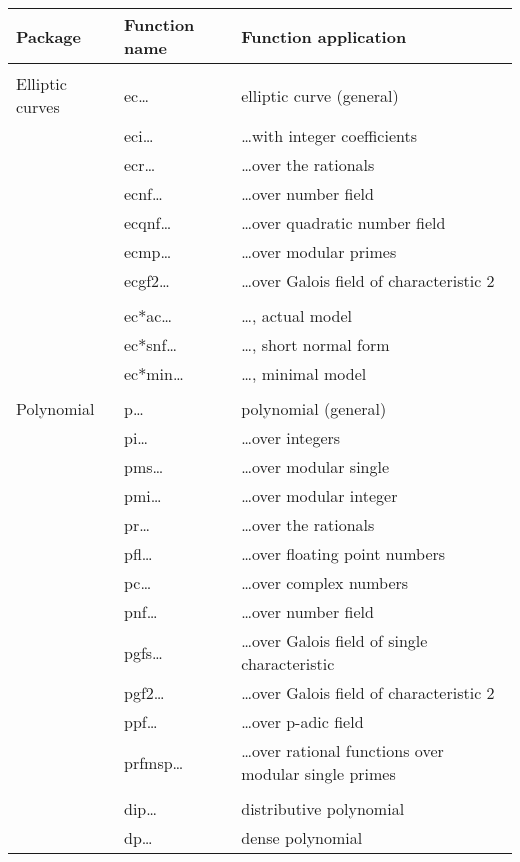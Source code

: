 \begin{tabular}{p{1.0in}p{1.3in}p{3.0in}}
 Package           & Function name & Function application \\ \hline
                   &               & \\
 Elliptic curves   & ec\ldots      & elliptic curve (general)\\
                   & eci\ldots     & \ldots with integer coefficients\\
                   & ecr\ldots     & \ldots over the rationals\\
                   & ecnf\ldots    & \ldots over number field\\
                   & ecqnf\ldots   & \ldots over quadratic number field\\
                   & ecmp\ldots    & \ldots over modular primes\\
                   & ecgf2\ldots   & \ldots over Galois field of characteristic 2\\
                   &               & \\
                   & ec$\ast$ac\ldots   & \ldots , actual model\\
                   & ec$\ast$snf\ldots  & \ldots , short normal form\\
                   & ec$\ast$min\ldots  & \ldots , minimal model\\
                   &               & \\
 Polynomial        & p\ldots       & polynomial (general)\\
                   & pi\ldots      & \ldots over integers\\
                   & pms\ldots     & \ldots over modular single\\
                   & pmi\ldots     & \ldots over modular integer\\ 
                   & pr\ldots      & \ldots over the rationals\\
                   & pfl\ldots     & \ldots over floating point numbers\\
                   & pc\ldots      & \ldots over complex numbers\\
                   & pnf\ldots     & \ldots over number field\\
                   & pgfs\ldots    & \ldots over Galois field of single characteristic\\
                   & pgf2\ldots    & \ldots over Galois field of characteristic 2\\
                   & ppf\ldots     & \ldots over p-adic field\\
                   & prfmsp\ldots  & \ldots over rational functions over modular single primes \\
                   &               & \\
                   & dip\ldots     & distributive polynomial\\
                   & dp\ldots      & dense polynomial\\


\end{tabular}
